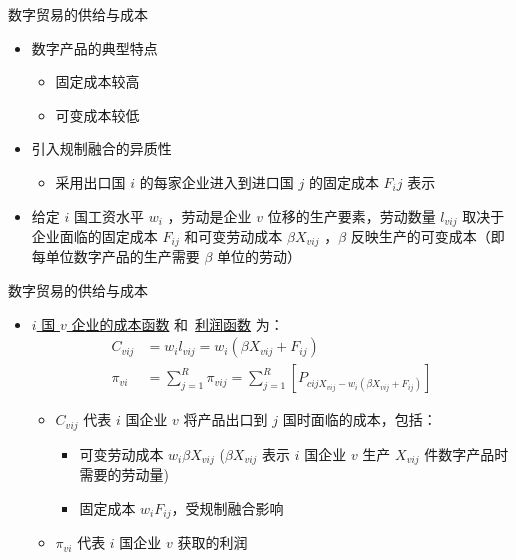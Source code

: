 \documentclass{beamer}
\begin{document}
\begin{frame}{数字贸易的供给与成本}
    \begin{itemize}
        \item 数字产品的典型特点
        \begin{itemize}
            \item 固定成本较高
            \item 可变成本较低
        \end{itemize}
        \item 引入规制融合的异质性
        \begin{itemize}
            \item 采用出口国 $i$ 的每家企业进入到进口国 $j$ 的固定成本 $F_ij$ 表示
        \end{itemize}
        \item 给定 $i$ 国工资水平 $w_i$ ，劳动是企业 $v$ 位移的生产要素，劳动数量 $l_{vij}$ 取决于企业面临的固定成本 $F_{ij}$ 和可变劳动成本 $\beta X_{vij}$ ，$\beta$ 反映生产的可变成本（即每单位数字产品的生产需要 $\beta$ 单位的劳动）
    \end{itemize}
\end{frame}

\begin{frame}{数字贸易的供给与成本}
    \begin{itemize}
        \item \underline{$i$ 国 $v$ 企业的成本函数} 和\ \underline{利润函数} 为：
        \begin{align*}
            C_{vij} &= w_i l_{vij} = w_i(\beta X_{vij} + F_{ij}) \tag{5} \\
            \pi_{vi} &= \sum_{j=1}^{R} \pi_{vij} = \sum_{j=1}^{R} [P_{cij X_{vij} - w_i(\beta X_{vij} + F_{ij})}] \tag{6}
        \end{align*}
        \begin{itemize}
            \item $C_{vij}$ 代表 $i$ 国企业 $v$ 将产品出口到 $j$ 国时面临的成本，包括：
            \begin{itemize}
                \item 可变劳动成本 $w_i \beta X_{vij}$ ({$\beta X_{vij}$ 表示 $i$ 国企业 $v$ 生产 $X_{vij}$ 件数字产品时需要的劳动量})
                \item 固定成本 $w_i F_{ij}$，受规制融合影响
            \end{itemize}
            \item $\pi_{vi}$ 代表 $i$ 国企业 $v$ 获取的利润
        \end{itemize}
    \end{itemize}
\end{frame}
\end{document}

